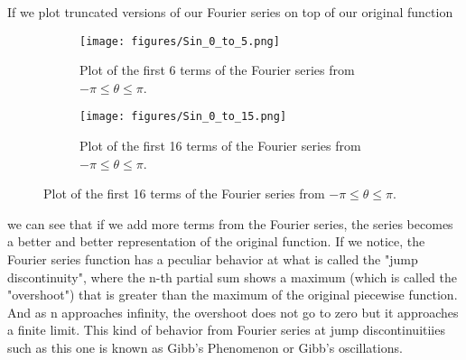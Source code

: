 \documentclass{article}
\begin{document}
If we plot truncated versions of our Fourier series on top of our original function
\begin{figure}[h]
  \centering
  \begin{subfigure}[b]{0.4\textwidth}
    \texttt{[image: figures/Sin\_0\_to\_5.png]}
    \caption{Plot of the first 6 terms of the Fourier series from $- \pi \leq \theta \leq \pi$.}
  \end{subfigure}
  \hspace{1cm}
  \begin{subfigure}[b]{0.4\textwidth}
    \texttt{[image: figures/Sin\_0\_to\_15.png]}
    \caption{Plot of the first 16 terms of the Fourier series from $- \pi \leq \theta \leq \pi$.}
  \end{subfigure}
\end{figure}
we can see that if we add more terms from the Fourier series, the series becomes a better and better representation of the original function.
If we notice, the Fourier series function has a peculiar behavior at what is called the "jump discontinuity", where the n-th partial sum shows a maximum (which is called the "overshoot") that is greater than the maximum of the original piecewise function.
And as n approaches infinity, the overshoot does not go to zero but it approaches a finite limit.
This kind of behavior from Fourier series at jump discontinuitiies such as this one is known as Gibb's Phenomenon or Gibb's oscillations.
\end{document}
